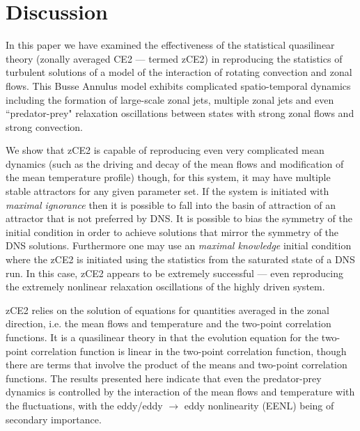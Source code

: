 \documentclass{jfm}
\begin{document}
\section{Discussion}
\label{sec:discussion}

In this paper we have examined the effectiveness of the statistical quasilinear theory (zonally averaged CE2 --- termed zCE2) in reproducing the statistics of turbulent solutions of a model of the interaction of rotating convection and zonal flows. This Busse Annulus model exhibits complicated spatio-temporal dynamics including the formation of large-scale zonal jets, multiple zonal jets and even ``predator-prey" relaxation oscillations between states with strong zonal flows and strong convection.

We show that zCE2 is capable of reproducing even very complicated mean dynamics (such as the driving and decay of the mean flows and modification of the mean temperature profile) though, for this system, it may have multiple stable attractors for any given parameter set. If the system is initiated with \textit{maximal ignorance} then it is possible to fall into the basin of attraction of an attractor that is not preferred by DNS. It is possible to bias the symmetry of the initial condition in order to achieve solutions that mirror the symmetry of the DNS solutions. Furthermore one may use an \textit{maximal knowledge} initial condition where the zCE2 is initiated using the statistics from the saturated state of a DNS run. In this case, zCE2 appears to be extremely successful --- even reproducing the extremely nonlinear relaxation oscillations of the highly driven system.

zCE2 relies on the solution of equations for quantities averaged in the zonal direction, i.e. the mean flows and temperature and the two-point correlation functions.  It is a quasilinear theory in that the evolution equation for the two-point correlation function 
is linear in the two-point correlation function, though there are terms that involve the product of the means and two-point correlation functions. The results presented here indicate that even the predator-prey dynamics is controlled by the interaction of the mean flows and temperature with the fluctuations, with the eddy/eddy $\rightarrow$ eddy nonlinearity (EENL) being of secondary importance. 
\end{document}
